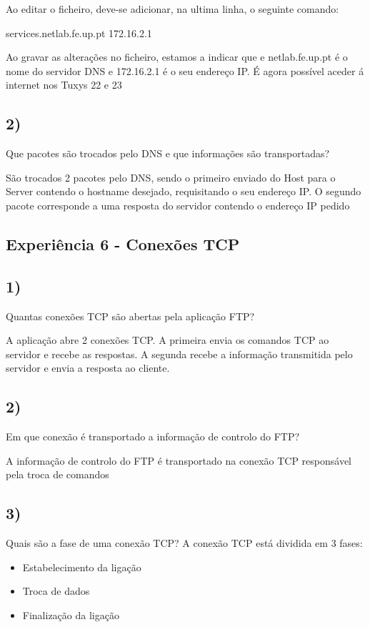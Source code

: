 \documentclass[11pt]{article}
\begin{document}
Ao editar o ficheiro, deve-se adicionar, na ultima linha, o seguinte comando:

services.netlab.fe.up.pt 172.16.2.1

Ao gravar as alterações no ficheiro, estamos a indicar que e netlab.fe.up.pt é o nome do servidor DNS e 172.16.2.1 é o seu endereço IP. É agora possível aceder á internet nos Tuxys 22 e 23


\subsection{2)} Que pacotes são trocados pelo DNS e que informações são transportadas? 

São trocados 2 pacotes pelo DNS, sendo o primeiro enviado do Host para o Server contendo o hostname desejado, requisitando o seu endereço IP. O segundo pacote corresponde a uma resposta do servidor contendo o endereço IP pedido

\subsection{Experiência 6 - Conexões TCP}

\subsection{1)} Quantas conexões TCP são abertas pela aplicação FTP?

A aplicação abre 2 conexões TCP. A primeira envia os comandos TCP ao servidor e recebe as respostas. A segunda recebe a informação transmitida pelo servidor e envia a resposta ao cliente.

\subsection{2)} Em que conexão é transportado a informação de controlo do FTP?

A informação de controlo do FTP é transportado na conexão TCP responsável pela troca de comandos

\subsection{3)} Quais são a fase de uma conexão TCP?
A conexão TCP está dividida em 3 fases:

\begin{itemize}
\item Estabelecimento da ligação
\item Troca de dados
\item Finalização da ligação
\end{itemize}
\end{document}
